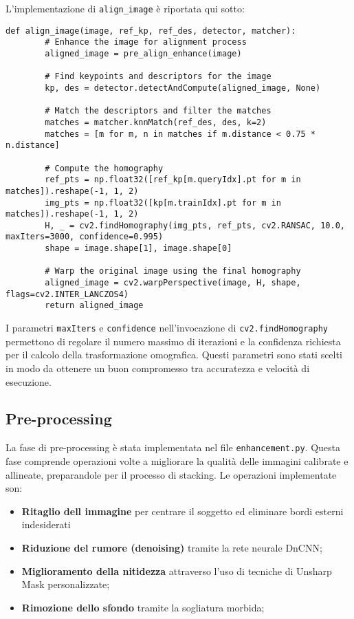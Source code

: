 L'implementazione di \texttt{align\_image} è riportata qui sotto:

\begin{lstlisting}[label={lst:single_alignment}]
    def align_image(image, ref_kp, ref_des, detector, matcher):
        # Enhance the image for alignment process
        aligned_image = pre_align_enhance(image)

        # Find keypoints and descriptors for the image
        kp, des = detector.detectAndCompute(aligned_image, None)

        # Match the descriptors and filter the matches
        matches = matcher.knnMatch(ref_des, des, k=2)
        matches = [m for m, n in matches if m.distance < 0.75 * n.distance]
        
        # Compute the homography
        ref_pts = np.float32([ref_kp[m.queryIdx].pt for m in matches]).reshape(-1, 1, 2)
        img_pts = np.float32([kp[m.trainIdx].pt for m in matches]).reshape(-1, 1, 2)
        H, _ = cv2.findHomography(img_pts, ref_pts, cv2.RANSAC, 10.0, maxIters=3000, confidence=0.995)
        shape = image.shape[1], image.shape[0]
        
        # Warp the original image using the final homography
        aligned_image = cv2.warpPerspective(image, H, shape, flags=cv2.INTER_LANCZOS4)
        return aligned_image
\end{lstlisting}

I parametri \texttt{maxIters} e \texttt{confidence} nell'invocazione di \texttt{cv2.findHomography} permettono di regolare il numero massimo di iterazioni e la confidenza richiesta per il calcolo della trasformazione omografica. Questi parametri sono stati scelti in modo da ottenere un buon compromesso tra accuratezza e velocità di esecuzione.

\subsection{Pre-processing} \label{subsec:preprocessing_impl}

La fase di pre-processing è stata implementata nel file \texttt{enhancement.py}. Questa fase comprende operazioni volte a migliorare la qualità delle immagini calibrate e allineate, preparandole per il processo di stacking. Le operazioni implementate son:

\begin{itemize}
    \item \textbf{Ritaglio dell immagine} per centrare il soggetto ed eliminare bordi esterni indesiderati
    \item \textbf{Riduzione del rumore (denoising)} tramite la rete neurale DnCNN;
    \item \textbf{Miglioramento della nitidezza} attraverso l'uso di tecniche di Unsharp Mask personalizzate;
    \item \textbf{Rimozione dello sfondo} tramite la sogliatura morbida;
\end{itemize}

